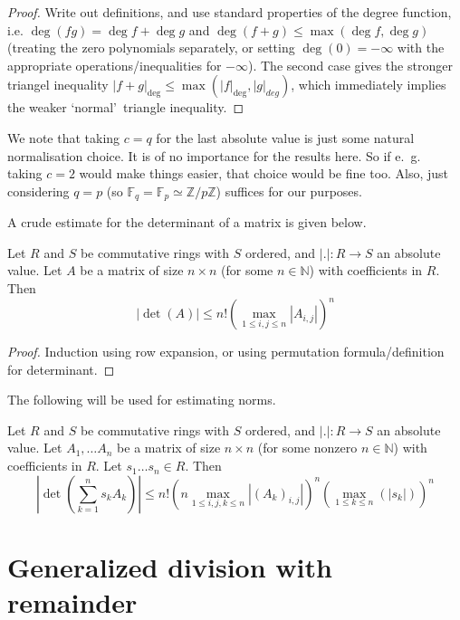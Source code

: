 \documentclass{amsart}
\newcommand{\N}{\mathbb{N}}
\newcommand{\Z}{\mathbb{Z}}
\newcommand{\F}{\mathbb{F}}
\begin{document}
\begin{proof}
Write out definitions, and use standard properties of the degree function, i.e. $\deg (fg)=\deg f+\deg g$ and $\deg(f+g)\leq \max(\deg f,\deg g)$ (treating the zero polynomials separately, or setting $\deg(0)=-\infty$ with the appropriate operations/inequalities for $-\infty$). The second case gives the stronger triangel inequality $|f+g|_{\deg} \leq \max(|f|_{\deg},|g|_{deg})$, which  immediately implies the weaker \lq normal\rq\ triangle inequality.
\end{proof}

We note that taking $c=q$ for the last absolute value is just some natural normalisation choice. It is of no importance for the results here. So if e.~g.~ taking $c=2$ would make things easier, that choice would be fine too. Also, just considering $q=p$ (so $\F_q=\F_p \simeq \Z/p\Z$) suffices for our purposes.

A crude estimate for the determinant of a matrix is given below.
\begin{lemma}
Let $R$ and $S$ be commutative rings with $S$ ordered, and $|.|:R \to S$ an absolute value.
Let $A$ be a matrix of size $n \times n$ (for some $n\in \N$) with coefficients in $R$. Then 
\[|\det(A)|\leq n! \left(\max_{1\leq i,j\leq n} |A_{i,j}|\right)^n\]
\end{lemma}

\begin{proof}
Induction using row expansion, or using permutation formula/definition for determinant.
\end{proof}

The following will be used for estimating norms.

\begin{corollary}\label{cor estimate norm}
Let $R$ and $S$ be commutative rings with $S$ ordered, and $|.|:R \to S$ an absolute value.
Let $A_1,\ldots A_n$ be a matrix of size $n \times n$ (for some nonzero $n\in \N$) with coefficients in $R$. Let $s_1\ldots s_n \in R$. Then 
\[ \left|\det(\sum_{k=1}^n s_k A_k) \right| \leq n! \left(n \max_{1\leq i,j,k\leq n} |(A_k)_{i,j}|\right)^n \left( \max_{1\leq k\leq n}(|s_k|) \right)^n\]
\end{corollary}

\section{Generalized division with remainder}
\end{document}
